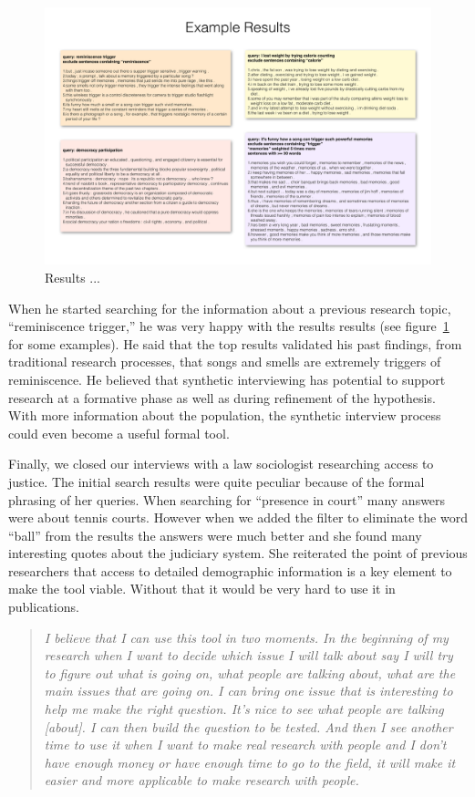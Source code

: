 \documentclass{sigchi}
\begin{document}
\begin{figure}[ht!]
\centering \includegraphics[width=\textwidth]{figures/results_2} 
\caption{Results ... \label{fig:reminiscenceTriggers}}
\end{figure}

When he started searching for the information about a previous research topic, ``reminiscence trigger,'' he was very happy with the results results (see figure~\ref{fig:reminiscenceTriggers} for some examples). He said that the top results validated his past findings, from traditional research processes, that songs and smells are extremely triggers of reminiscence. He believed that synthetic interviewing has potential to support research at a formative phase as well as during refinement of the hypothesis. With more information about the population, the synthetic interview process could even become a useful formal tool.

Finally, we closed our interviews with a law sociologist researching access to justice. The initial search results were quite peculiar because of the formal phrasing of her queries. When searching for ``presence in court'' many answers were about tennis courts. However when we added the filter to eliminate the word ``ball'' from the results the answers were much better and she found many interesting quotes about the judiciary system. She reiterated the point of previous researchers that access to detailed demographic information is a key element to make the tool viable. Without that it would be very hard to use it in publications.


\begin{quote}
{\em
I believe that I can use this tool in two moments. In the beginning of my research when I want to decide which issue I will talk about say I will try to figure out what is going on, what people are talking about, what are the main issues that are going on. I can bring one issue that is interesting to help me make the right question. It's nice to see what people are talking [about]. I can then build the question to be tested. And then I see another time to use it when I want to make real research with people and I don't have enough money or have enough time to go to the field, it will make it easier and more applicable to make research with people. 
}\end{quote}
\end{document}
